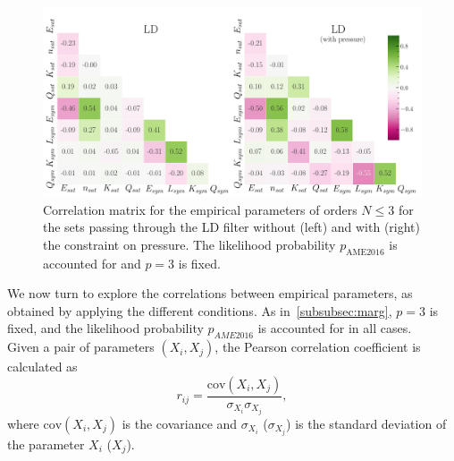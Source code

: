 \begin{figure}[!t]
\begin{center}
  \includegraphics[width=1.0\linewidth]{figures/cm_ld.pdf}
\end{center}
\caption[Correlations among empirical parameters for the sets passing through
the low-density filter]{Correlation matrix for the empirical parameters of 
  orders $N \leq 3$ for the sets passing through the LD filter without (left) 
  and with (right) the constraint on pressure. The likelihood probability 
$p_{\text{AME2016}}$ is accounted for and $p=3$ is fixed.}\label{fig:cm_ld}
\end{figure}
 
We now turn to explore the correlations between empirical parameters, as
obtained by applying the different conditions. As in~\ref{subsubsec:marg},
$p=3$ is fixed, and the likelihood probability $p_{AME2016}$ is accounted for 
in all cases.\\
Given a pair of parameters $(X_i,X_j)$, the Pearson correlation coefficient is 
calculated as 
%
\begin{equation}
  r_{ij} = \frac{\text{cov}(X_i,X_j)}{\sigma_{X_i}\sigma_{X_j}},
\end{equation}
%
where $\text{cov}(X_i,X_j)$ is the covariance and $\sigma_{X_i}$ 
($\sigma_{X_j}$) is the standard deviation of the parameter $X_i$ ($X_j$).


